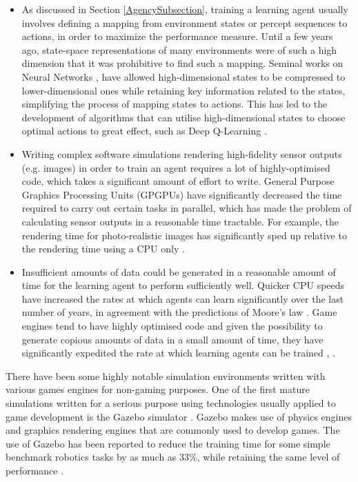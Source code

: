 \begin{itemize}
    \item
    As discussed in Section \ref{AgencySubsection}, training a learning agent usually involves defining a mapping from environment states or percept sequences to actions, in order to maximize the performance measure. Until a few years ago, state-space representations of many environments were of such a high dimension that it was prohibitive to find such a mapping. Seminal works on Neural Networks \cite{Lecun1998Gradient-BasedRecognition}, \cite{Krizhevsky2012ImageNetNetworks} have allowed high-dimensional states to be compressed to lower-dimensional ones while retaining key information related to the states, simplifying the process of mapping states to actions. This has led to the development of algorithms that can utilise high-dimensional states to choose optimal actions to great effect, such as Deep Q-Learning \cite{Mnih2013PlayingLearning}.
    \item Writing complex software simulations rendering high-fidelity sensor outputs (e.g. images) in order to train an agent requires a lot of highly-optimised code, which takes a significant amount of effort to write.
    General Purpose Graphics Processing Units (GPGPUs) have significantly decreased the time required to carry out certain tasks in parallel, which has made the problem of calculating sensor outputs in a reasonable time tractable. For example, the rendering time for photo-realistic images has significantly sped up relative to the rendering time using a CPU only \cite{Ryoo2008OptimizationCUDA}.
    \item Insufficient amounts of data could be generated in a reasonable amount of time for the learning agent to perform sufficiently well. Quicker CPU speeds have increased the rates at which agents can learn significantly over the last number of years, in agreement with the predictions of Moore's law \cite{MacK2011FiftyLaw}. Game engines tend to have highly optimised code and given the possibility to generate copious amounts of data in a small amount of time, they have significantly expedited the rate at which learning agents can be trained \cite{Juliani2018Unity:Agents}, \cite{Sadeghi2016CADImage}. 
\end{itemize}

There have been some highly notable simulation environments written with various games engines for non-gaming purposes. One of the first mature simulations written for a serious purpose using technologies usually applied to game development is the Gazebo simulator \cite{Koenig2005DesignSimulator}. Gazebo makes use of physics engines and graphics rendering engines that are commonly used to develop games. The use of Gazebo has been reported to reduce the training time for some simple benchmark robotics tasks by as much as 33\%, while retaining the same level of performance \cite{Vilches2018RobotGazebo}. 

